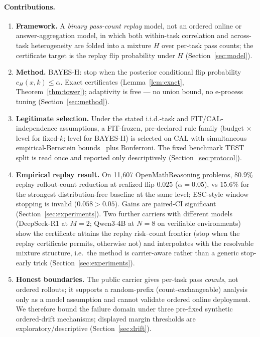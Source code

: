 \documentclass{article}
\theoremstyle{definition}
\theoremstyle{remark}
\begin{document}
\paragraph{Contributions.}
\begin{enumerate}[leftmargin=1.6em,itemsep=1pt]
\item \textbf{Framework.} A \emph{binary pass-count replay} model, not an
ordered online or answer-aggregation model, in which both within-task
correlation and across-task heterogeneity are folded into a mixture $H$ over
per-task pass counts; the certificate target is the replay flip probability
under $H$ (Section~\ref{sec:model}).
\item \textbf{Method.} BAYES-H: stop when the posterior conditional flip
probability $c_H(x,k)\le\alpha$. Exact certificates (Lemma~\ref{lem:exact}, Theorem~\ref{thm:tower}); adaptivity is free --- no union
bound, no e-process tuning (Section~\ref{sec:method}).
\item \textbf{Legitimate selection.} Under the stated i.i.d.-task and
FIT/CAL-independence assumptions, a FIT-frozen, pre-declared rule family
(budget $\times$ level for fixed-$k$; level for BAYES-H) is selected on CAL
with simultaneous empirical-Bernstein bounds~\citep{maurer2009eb} plus
Bonferroni.  The fixed benchmark TEST split is read once and reported only
descriptively (Section~\ref{sec:protocol}).
\item \textbf{Empirical replay result.} On 11{,}607 OpenMathReasoning problems,
$80.9\%$ replay rollout-count reduction at realized flip $0.025$ ($\alpha=0.05$), vs $15.6\%$
for the strongest distribution-free baseline at the same level; ESC-style
window stopping is invalid ($0.058>0.05$). Gains are paired-CI significant
(Section~\ref{sec:experiments}). Two further carriers with different models
(DeepSeek-R1 at $M=2$; Qwen3-4B at $N=8$ on verifiable environments) show the
certificate attains the replay risk--count frontier (stop when the replay
certificate permits, otherwise not)
and interpolates with the resolvable mixture structure, i.e.\ the method is
carrier-aware rather than a generic stop-early trick
(Section~\ref{sec:experiments}).
\item \textbf{Honest boundaries.} The public carrier gives per-task pass
\emph{counts}, not ordered rollouts; it supports a random-prefix
(count-exchangeable) analysis only as a model assumption and cannot validate
ordered online deployment. We therefore bound the failure domain under three
pre-fixed synthetic ordered-drift mechanisms; displayed margin thresholds are
exploratory/descriptive (Section~\ref{sec:drift}).
\end{enumerate}
\end{document}

